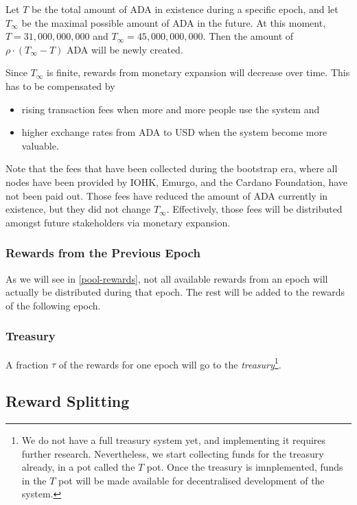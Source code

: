 \documentclass[11pt,a4paper]{article}
\begin{document}
Let \(T\) be the total amount of ADA in existence during a specific
epoch, and let \(T_\infty\) be the maximal possible amount of ADA in the
future. At this moment, \(T=31,000,000,000\) and
\(T_\infty=45,000,000,000\). Then the amount of
\(\rho\cdot(T_\infty - T)\) ADA will be newly created.

Since \(T_\infty\) is finite, rewards from monetary expansion will
decrease over time. This has to be compensated by

\begin{itemize}
\item
  rising transaction fees when more and more people use the system and
\item
  higher exchange rates from ADA to USD when the system become more
  valuable.
\end{itemize}

Note that the fees that have been collected during the bootstrap era,
where all nodes have been provided by IOHK, Emurgo, and the Cardano
Foundation, have not been paid out. Those fees have reduced the amount
of ADA currently in existence, but they did not change
\(T_\infty\). Effectively, those fees will be distributed amongst
future stakeholders via monetary expansion.

\subsubsection{Rewards from the Previous Epoch}
\label{rewards-from-the-previous-epoch}

As we will see in \cref{pool-rewards}, not all available rewards
from an epoch will actually be distributed during that epoch. The rest
will be added to the rewards of the following epoch.

\subsubsection{Treasury}
\label{treasury}

A fraction \(\tau\) of the rewards for one epoch will go to the
\emph{treasury}\footnote{We do not have a full treasury system yet, and
  implementing it requires further research. Nevertheless, we start collecting
  funds for the treasury already, in a pot called the \(T\) pot. Once the
  treasury is imnplemented, funds in the \(T\) pot will be made available for
  decentralised development of the system.}.

\subsection{Reward Splitting}
\label{reward-splitting}
\end{document}
